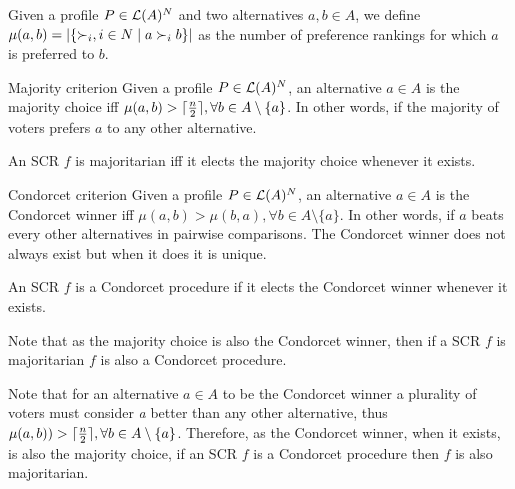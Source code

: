 	Given a profile $P\in\mathcal{L}(A)^{N}$ and two alternatives $a,b\in A$, we define $\mu(a,b)=|\{\mathbin{\prefi}, i \in N \suchthat a\prefi b\}|$ as the number of preference rankings for which $a$ is preferred to $b$. 
	
	\begin{genthm}{Majority criterion}
	Given a profile $P\in\mathcal{L}(A)^{N}$, an alternative $a\in A$ is the majority choice iff $\mu(a,b)> \lceil\frac{n}{2}\rceil, \forall b\in{A\setminus{\{a\}}}$. In other words, if the majority of voters prefers $a$ to any other alternative.
		
	An \acs{SCR} $f$ is majoritarian iff it elects the majority choice whenever it exists.
	\end{genthm}
	
	\begin{genthm}{Condorcet criterion}
	Given a profile $P\in\mathcal{L}(A)^{N}$, an alternative $a\in A$ is the Condorcet winner iff $\mu(a,b)> \mu(b,a), \forall b\in{A\setminus{\{a\}}}$. In other words, if $a$ beats every other alternatives in pairwise comparisons. The Condorcet winner does not always exist but when it does it is unique.
	
	An \acs{SCR} $f$ is a Condorcet procedure if it elects the Condorcet winner whenever it exists.	
	\end{genthm}

	 Note that as the majority choice is also the Condorcet winner, then if a \acs{SCR} $f$ is majoritarian $f$ is also a Condorcet procedure.
	
	Note that for an alternative $a \in A$ to be the Condorcet winner a plurality of voters must consider \textit{a} better than any other alternative, thus $\mu(a,b)) > \lceil\frac{n}{2}\rceil, \forall b\in{A\setminus{\{a\}}}$. Therefore, as the Condorcet winner, when it exists, is also the majority choice, if an \acs{SCR} $f$ is a Condorcet procedure then $f$ is also majoritarian.

